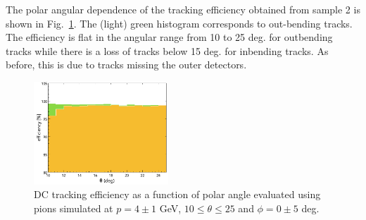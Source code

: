 The polar angular dependence of the tracking efficiency obtained from sample 2 is shown in Fig.~\ref{fig:trkeffinoutb}.   The (light) green histogram corresponds to out-bending tracks.  The efficiency is flat in the angular range from 10 to 25 deg. for outbending tracks while there is a loss of tracks below 15 deg. for inbending tracks. As before, this is due to tracks missing the outer detectors.  

\begin{figure}
\includegraphics[width=0.45\textwidth]{pics/DCTrkEffvsThetaInandOutbenders.png}
\caption{DC tracking efficiency as a function of polar angle evaluated using  pions  simulated at $p=4\pm 1$ GeV, $10\leq \theta\leq 25$ and $\phi = 0 \pm 5$ deg.
}
\label{fig:trkeffinoutb}
\end{figure}

